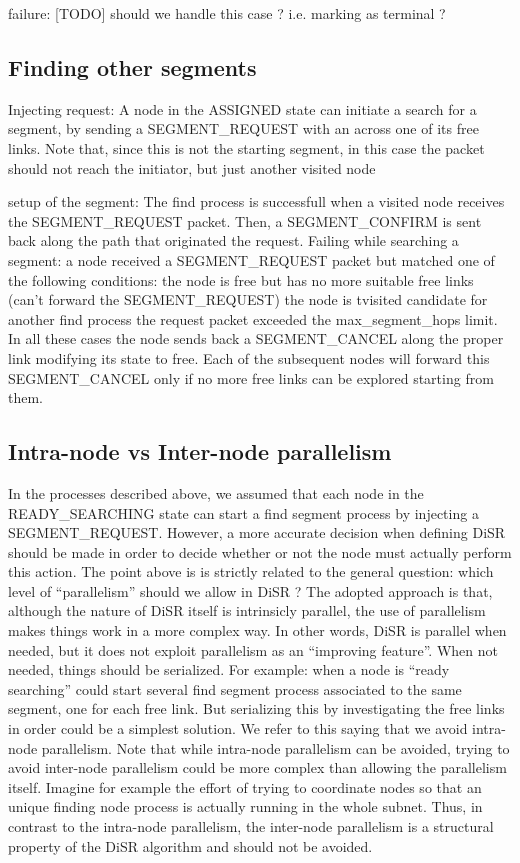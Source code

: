 \documentclass[conference]{IEEEtran}
\begin{document}
failure: [TODO] should we handle this case ? i.e.
marking as terminal ?

\subsection{Finding other segments}

Injecting request: A node in the ASSIGNED state can initiate a search for a
segment, by sending a SEGMENT_REQUEST with an across one of its free
links. Note that, since this is not the starting segment, in this case
the packet should not reach the initiator, but just another visited
node

setup of the segment: The find process is successfull when a visited
node receives the SEGMENT_REQUEST packet. Then, a SEGMENT_CONFIRM is
sent back along the path that originated the request.  Failing while
searching a segment: a node received a SEGMENT_REQUEST packet but
matched one of the following conditions: the node is free but has no
more suitable free links (can’t forward the SEGMENT_REQUEST) the node
is tvisited candidate for another find process the request packet
exceeded the max_segment_hops limit.  In all these cases the node
sends back a SEGMENT_CANCEL along the proper link modifying its state
to free. Each of the subsequent nodes will forward this SEGMENT_CANCEL
only if no more free links can be explored starting from them.


\subsection{Intra-node vs Inter-node parallelism}
In the processes described above, we assumed that each node in the
READY_SEARCHING state can start a find segment process by injecting a
SEGMENT_REQUEST. However, a more accurate decision when defining DiSR
should be made in order to decide whether or not the node must
actually perform this action. 
The point above is is strictly related to the general question: which
level of “parallelism” should we allow in DiSR ? The adopted approach
is that, although the nature of DiSR itself is intrinsicly parallel,
the use of parallelism makes things work in a more complex way. In
other words, DiSR is parallel when needed, but it does not exploit
parallelism as an “improving feature”. When not needed, things should
be serialized. For example: when a node is “ready searching” could
start several find segment process associated to the same segment, one
for each free link. But serializing this by investigating the free
links in order could be a simplest solution. We refer to this saying
that we avoid intra-node parallelism.  Note that while intra-node
parallelism can be avoided, trying to avoid inter-node parallelism
could be more complex than allowing the parallelism itself. Imagine
for example the effort of trying to coordinate nodes so that an unique
finding node process is actually running in the whole subnet. Thus, in
contrast to the intra-node parallelism, the inter-node parallelism is
a structural property of the DiSR algorithm and should not be avoided.
\end{document}
